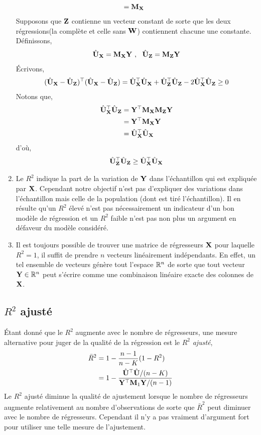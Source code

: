 \begin{enumerate}
\begin{align*}
& = \mathbf M_\mathbf X
\end{align*}
Supposons que $\mathbf Z$ contienne un vecteur constant de sorte que les deux régressions(la complète et celle sans $\mathbf W$) contiennent chacune une constante. Définissons,
\begin{align*}
\hat{\mathbf U}_\mathbf X = \mathbf M_\mathbf X\mathbf Y \ , \ \  
\hat{\mathbf U}_\mathbf Z = \mathbf M_\mathbf Z\mathbf Y
\end{align*}
\'Ecrivons,
\begin{align*}
(\hat{\mathbf U}_\mathbf X - \hat{\mathbf U}_\mathbf Z)^\top(\hat{\mathbf U}_\mathbf X - \hat{\mathbf U}_\mathbf Z) = \hat{\mathbf U}_\mathbf X^\top \hat{\mathbf U}_\mathbf X + \hat{\mathbf U}_\mathbf Z^\top\hat{\mathbf U}_\mathbf Z -2\hat{\mathbf U}_\mathbf X ^\top\hat{\mathbf U}_\mathbf Z\geq 0
\end{align*}
Notons que,
\begin{align*}
\hat{\mathbf U}_\mathbf X ^\top\hat{\mathbf U}_\mathbf Z  &= \mathbf Y^\top\mathbf M_\mathbf X\mathbf M_\mathbf Z\mathbf Y\\
& = 
\mathbf Y^\top\mathbf M_\mathbf X\mathbf Y\\
& = \hat{\mathbf U}_\mathbf X^\top\hat{\mathbf U}_\mathbf X
\end{align*}
d'où,
\begin{align*}
\hat{\mathbf U}_\mathbf Z^\top\hat{\mathbf U}_\mathbf Z\geq \hat{\mathbf U}_\mathbf X^\top\hat{\mathbf U}_\mathbf X
\end{align*}
\item Le $R^2$ indique la part de la variation de $\mathbf Y$ dans l'échantillon qui est expliquée par $\mathbf X$. Cependant notre objectif n'est pas d'expliquer des variations dans l'échantillon mais celle de la population (dont est tiré l'échantillon). Il en résulte qu'un $R^2$ élevé n'est pas nécessairement un indicateur d'un bon modèle de régression et un $R^2$ faible n'est pas non plus un argument en défaveur du modèle considéré.
\item Il est toujours possible de trouver une matrice de régresseurs $\mathbf X$ pour laquelle $R^2 = 1$, il suffit de prendre $n$ vecteurs linéairement indépendants. En effet, un tel ensemble de vecteurs génère tout l'espace $\mathbb{R}^n$ de sorte que tout vecteur $\mathbf Y\in\mathbb{R}^n$ peut s'écrire comme une combinaison linéaire exacte des colonnes de $\mathbf X$.
\end{enumerate}

\subsection{$R^2$ ajusté}
\'Etant donné que le $R^2$ augmente avec le nombre de régresseurs, une mesure alternative pour juger de la qualité de la régression est le $R^2$ \emph{ajusté},
\begin{align*}
\bar{R}^2 &= 1 - \frac{n-1}{n-K}(1 - R^2)\\
& = 1 - \frac{\hat{\mathbf U}^\top\hat{\mathbf U}/(n-K)}{\mathbf Y^\top\mathbf M_1\mathbf Y/(n-1)}
\end{align*}
Le $R^2$ ajusté diminue la qualité de ajustement lorsque le nombre de régresseurs augmente relativement au nombre d'observations de sorte que $\bar{R}^2 $ peut diminuer avec le nombre de régresseurs. Cependant il n'y a pas vraiment d'argument fort pour utiliser une telle mesure de l'ajustement.

